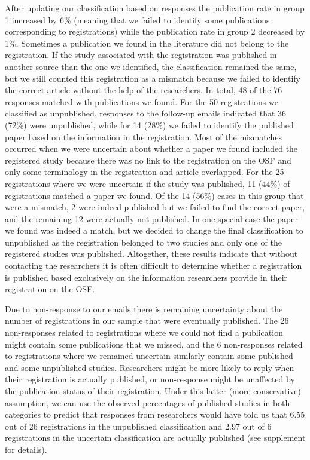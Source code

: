 \documentclass[
  ,jou, a4paper,floatsintext]{apa6}
\begin{document}
After updating our classification based on responses the publication rate in group 1 increased by 6\% (meaning that we failed to identify some publications corresponding to registrations) while the publication rate in group 2 decreased by 1\%. Sometimes a publication we found in the literature did not belong to the registration. If the study associated with the registration was published in another source than the one we identified, the classification remained the same, but we still counted this registration as a mismatch because we failed to identify the correct article without the help of the researchers. In total, 48 of the 76 responses matched with publications we found. For the 50 registrations we classified as unpublished, responses to the follow-up emails indicated that 36 (72\%) were unpublished, while for 14 (28\%) we failed to identify the published paper based on the information in the registration. Most of the mismatches occurred when we were uncertain about whether a paper we found included the registered study because there was no link to the registration on the OSF and only some terminology in the registration and article overlapped. For the 25 registrations where we were uncertain if the study was published, 11 (44\%) of registrations matched a paper we found. Of the 14 (56\%) cases in this group that were a mismatch, 2 were indeed published but we failed to find the correct paper, and the remaining 12 were actually not published. In one special case the paper we found was indeed a match, but we decided to change the final classification to unpublished as the registration belonged to two studies and only one of the registered studies was published. Altogether, these results indicate that without contacting the researchers it is often difficult to determine whether a registration is published based exclusively on the information researchers provide in their registration on the OSF.

Due to non-response to our emails there is remaining uncertainty about the number of registrations in our sample that were eventually published. The 26 non-responses related to registrations where we could not find a publication might contain some publications that we missed, and the 6 non-responses related to registrations where we remained uncertain similarly contain some published and some unpublished studies. Researchers might be more likely to reply when their registration is actually published, or non-response might be unaffected by the publication status of their registration. Under this latter (more conservative) assumption, we can use the observed percentages of published studies in both categories to predict that responses from researchers would have told us that 6.55 out of 26 registrations in the unpublished classification and 2.97 out of 6 registrations in the uncertain classification are actually published (see supplement for details).
\end{document}
